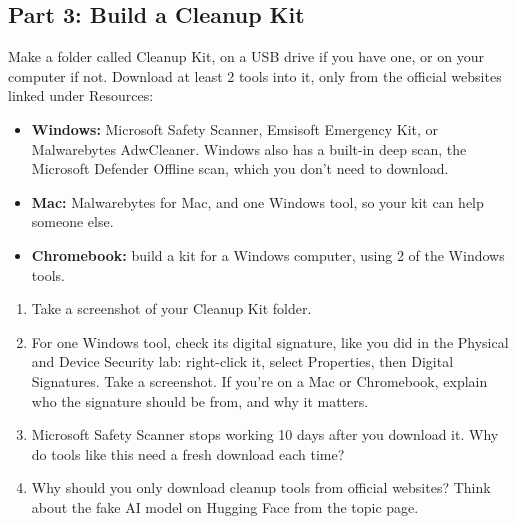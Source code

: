 \documentclass[12pt]{article}
\begin{document}
\subsection*{Part 3: Build a Cleanup Kit}
Make a folder called Cleanup Kit, on a USB drive if you have one, or on your computer if not. Download at least 2 tools into it, only from the official websites linked under Resources:
\begin{itemize}
    \item \textbf{Windows:} Microsoft Safety Scanner, Emsisoft Emergency Kit, or Malwarebytes AdwCleaner. Windows also has a built-in deep scan, the Microsoft Defender Offline scan, which you don't need to download.
    \item \textbf{Mac:} Malwarebytes for Mac, and one Windows tool, so your kit can help someone else.
    \item \textbf{Chromebook:} build a kit for a Windows computer, using 2 of the Windows tools.
\end{itemize}
\begin{enumerate}[start=10]
    \item Take a screenshot of your Cleanup Kit folder.
    \item For one Windows tool, check its digital signature, like you did in the Physical and Device Security lab: right-click it, select Properties, then Digital Signatures. Take a screenshot. If you're on a Mac or Chromebook, explain who the signature should be from, and why it matters.
    \item Microsoft Safety Scanner stops working 10 days after you download it. Why do tools like this need a fresh download each time?
    \item Why should you only download cleanup tools from official websites? Think about the fake AI model on Hugging Face from the topic page.
\end{enumerate}
\end{document}
